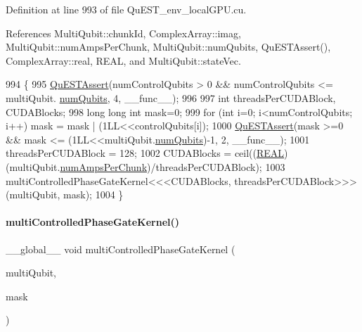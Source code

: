 Definition at line 993 of file Qu\+E\+S\+T\+\_\+env\+\_\+local\+G\+P\+U.\+cu.



References Multi\+Qubit\+::chunk\+Id, Complex\+Array\+::imag, Multi\+Qubit\+::num\+Amps\+Per\+Chunk, Multi\+Qubit\+::num\+Qubits, Qu\+E\+S\+T\+Assert(), Complex\+Array\+::real, R\+E\+AL, and Multi\+Qubit\+::state\+Vec.


\begin{DoxyCode}
994 \{
995     \mbox{\hyperlink{QuEST__env__localGPU_8cu_a3587b9d533e633ccf1abf9ad2ce45d8d}{QuESTAssert}}(numControlQubits > 0 && numControlQubits <= multiQubit.
      \mbox{\hyperlink{structMultiQubit_ab5b9795bdc6fb5855e1974dcbbaeb36f}{numQubits}}, 4, \_\_func\_\_);
996 
997     \textcolor{keywordtype}{int} threadsPerCUDABlock, CUDABlocks;
998     \textcolor{keywordtype}{long} \textcolor{keywordtype}{long} \textcolor{keywordtype}{int} mask=0;
999     \textcolor{keywordflow}{for} (\textcolor{keywordtype}{int} i=0; i<numControlQubits; i++) mask = mask | (1LL<<controlQubits[i]);
1000     \mbox{\hyperlink{QuEST__env__localGPU_8cu_a3587b9d533e633ccf1abf9ad2ce45d8d}{QuESTAssert}}(mask >=0 && mask <= (1LL<<multiQubit.\mbox{\hyperlink{structMultiQubit_ab5b9795bdc6fb5855e1974dcbbaeb36f}{numQubits}})-1, 2, \_\_func\_\_);
1001     threadsPerCUDABlock = 128;
1002     CUDABlocks = ceil((\mbox{\hyperlink{QuEST__precision_8h_a4b654506f18b8bfd61ad2a29a7e38c25}{REAL}})(multiQubit.\mbox{\hyperlink{structMultiQubit_a1cad83601a78635dd278259c7ed54f18}{numAmpsPerChunk}})/threadsPerCUDABlock);
1003     multiControlledPhaseGateKernel<<<CUDABlocks, threadsPerCUDABlock>>>(multiQubit, mask);
1004 \}
\end{DoxyCode}
\mbox{\label{QuEST__env__localGPU_8cu_a31833a4edc084f5bcdbf10ee6845064a}} 
\paragraph{\texorpdfstring{multi\+Controlled\+Phase\+Gate\+Kernel()}{multiControlledPhaseGateKernel()}}
{\footnotesize\ttfamily \+\_\+\+\_\+global\+\_\+\+\_\+ void multi\+Controlled\+Phase\+Gate\+Kernel (\begin{DoxyParamCaption}\item[{\mbox{\hyperlink{structMultiQubit}{Multi\+Qubit}}}]{multi\+Qubit,  }\item[{long long int}]{mask }\end{DoxyParamCaption})}



